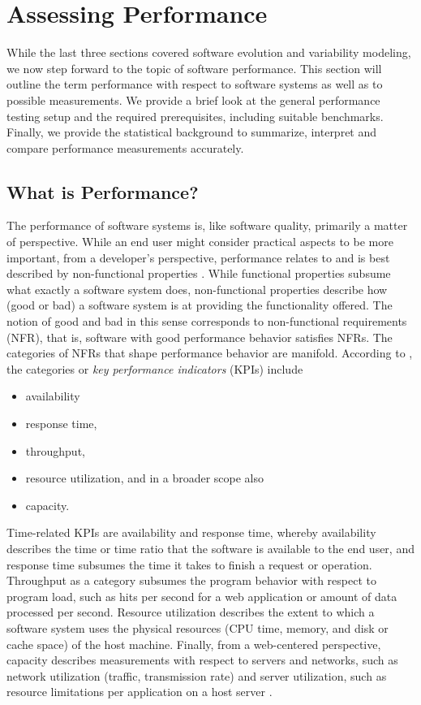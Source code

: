 \section{Assessing Performance} \label{sec:assessing_performance}
While the last three sections covered software evolution and variability
modeling, we now step forward to the topic of software performance. This
section will outline the term performance with respect to software systems as
well as to possible measurements. We provide a brief look at the general performance
testing setup and the required prerequisites, including suitable benchmarks.
Finally, we provide the statistical background to summarize, interpret and
compare performance measurements accurately.

\subsection{What is Performance?}
The performance of software systems is, like software quality, primarily a
matter of perspective. While an end user might consider practical aspects to be
more important, from a developer’s perspective, performance relates to and is
best described by non-functional properties \citep{molyneaux_art_2014}.
{\color{blue}While functional properties subsume what exactly a software system does, non-functional
properties describe how (good or bad) a software system is at providing the
functionality offered}. The notion of good and bad in this sense corresponds to
non-functional requirements (NFR), that is, software with good performance
behavior satisfies NFRs. The categories of NFRs that shape performance behavior
are manifold. According to \cite{molyneaux_art_2014}, the categories or
\emph{key performance indicators} (KPIs) include 

\begin{itemize}
  \item availability
  \item response time,
  \item throughput,
  \item resource utilization, and in a broader scope also 
  \item capacity.
\end{itemize}

Time-related KPIs are availability and response time, whereby
availability describes the time or time ratio that the software is available to
the end user, and response time subsumes the time it takes to finish a request
or operation. Throughput as a category subsumes the program behavior with
respect to program load, such as hits per second for a web application or
amount of data processed per second. Resource utilization describes the extent
to which a software system uses the physical resources (CPU time, memory, and
disk or cache space) of the host machine. Finally, from a web-centered
perspective, capacity describes measurements with respect to servers and
networks, such as network utilization  (traffic, transmission rate) and server
utilization, such as resource limitations per application on a host server
\citep{molyneaux_art_2014}.

